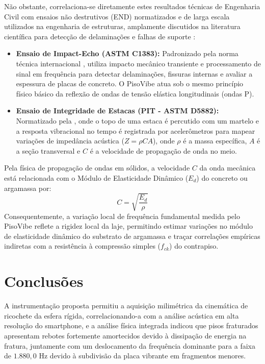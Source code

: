 \documentclass[10pt,twocolumn,fleqn]{article}
\begin{document}
	Não obstante, correlaciona-se diretamente estes resultados técnicas de Engenharia Civil com ensaios não destrutivos (END) normatizados e de larga escala utilizados na engenharia de estruturas, amplamente discutidos na literatura científica para detecção de delaminações e falhas de suporte \parencite{sansalone1997impact, carino2001impact}:
	
	\begin{itemize}[noitemsep]
		\item \textbf{Ensaio de Impact-Echo (ASTM C1383):} Padronizado pela norma técnica internacional \parencite{astmc1383}, utiliza impacto mecânico transiente e processamento de sinal em frequência para detectar delaminações, fissuras internas e avaliar a espessura de placas de concreto. O PisoVibe atua sob o mesmo princípio físico básico da reflexão de ondas de tensão elástica longitudinais (ondas P).
		\item \textbf{Ensaio de Integridade de Estacas (PIT - ASTM D5882):} Normatizado pela \parencite{astmd5882}, onde o topo de uma estaca é percutido com um martelo e a resposta vibracional no tempo é registrada por acelerômetros para mapear variações de impedância acústica ($Z = \rho C A$), onde $\rho$ é a massa específica, $A$ é a seção transversal e $C$ é a velocidade de propagação de onda no meio.
	\end{itemize}
	
	Pela física de propagação de ondas em sólidos, a velocidade $C$ da onda mecânica está relacionada com o Módulo de Elasticidade Dinâmico ($E_d$) do concreto ou argamassa por:
	\begin{equation}
	C = \sqrt{\frac{E_d}{\rho}}
	\end{equation}
	Consequentemente, a variação local de frequência fundamental medida pelo PisoVibe reflete a rigidez local da laje, permitindo estimar variações no módulo de elasticidade dinâmico do substrato de argamassa e traçar correlações empíricas indiretas com a resistência à compressão simples ($f_{ck}$) do contrapiso.
	
	\section{Conclusões}
	
	A instrumentação proposta permitiu a aquisição milimétrica da cinemática de ricochete da esfera rígida, correlacionando-a com a análise acústica em alta resolução do smartphone, e a análise física integrada indicou que pisos fraturados apresentam rebotes fortemente amortecidos devido à dissipação de energia na fratura, juntamente com um deslocamento da frequência dominante para a faixa de $1.880{,}0$ Hz devido à subdivisão da placa vibrante em fragmentos menores.
	
\end{document}
